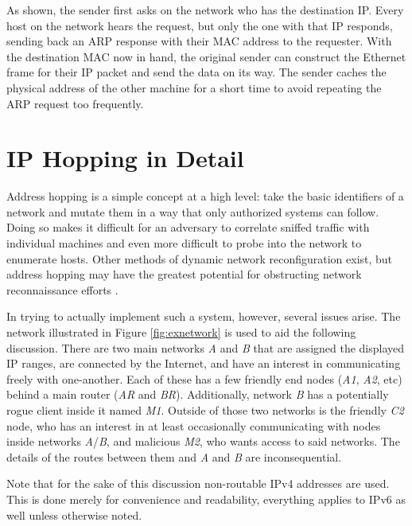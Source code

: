 \par As shown, the sender first asks on the network who has the destination \ac{IP}. Every host on the network hears the request, but only the one with that \ac{IP} responds, sending back an \ac{ARP} response with their \ac{MAC} address to the requester. With the destination \ac{MAC} now in hand, the original sender can construct the Ethernet frame for their \ac{IP} packet and send the data on its way. The sender caches the physical address of the other machine for a short time to avoid repeating the \ac{ARP} request too frequently.

\section{IP Hopping in Detail}
\label{sec:hopping}
\par Address hopping is a simple concept at a high level: take the basic identifiers of a network and mutate them in a way that only authorized systems can follow. Doing so makes it difficult for an adversary to correlate sniffed traffic with individual machines and even more difficult to probe into the network to enumerate hosts. Other methods of dynamic network reconfiguration exist, but address hopping may have the greatest potential for obstructing network reconnaissance efforts \cite{DefeatingAdversaryNIE}.

\par In trying to actually implement such a system, however, several issues arise.  The network illustrated in Figure \ref{fig:exnetwork} is used to aid the following discussion. There are two main networks \textit{A} and \textit{B} that are assigned the displayed IP ranges, are connected by the Internet, and have an interest in communicating freely with one-another. Each of these has a few friendly end nodes (\textit{A1}, \textit{A2}, etc) behind a main router (\textit{AR} and \textit{BR}). Additionally, network \textit{B} has a potentially rogue client inside it named \textit{M1}. Outside of those two networks is the friendly \textit{C2} node, who has an interest in at least occasionally communicating with nodes inside networks \textit{A}/\textit{B}, and malicious \textit{M2}, who wants access to said networks. The details of the routes between them and \textit{A} and \textit{B} are inconsequential.

\par Note that for the sake of this discussion non-routable \ac{IPv4} addresses are used. This is done merely for convenience and readability, everything applies to \ac{IPv6} as well unless otherwise noted.

